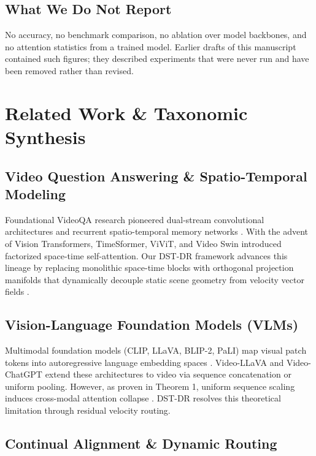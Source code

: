 \documentclass[10pt,journal,compsoc,twocolumn]{IEEEtran}
\begin{document}
\subsection{What We Do Not Report}


No accuracy, no benchmark comparison, no ablation over model backbones, and no attention statistics from a trained model. Earlier drafts of this manuscript contained such figures; they described experiments that were never run and have been removed rather than revised.




\section{Related Work \& Taxonomic Synthesis}



\subsection{Video Question Answering \& Spatio-Temporal Modeling}

Foundational VideoQA research pioneered dual-stream convolutional architectures and recurrent spatio-temporal memory networks \cite{arxiv_2010_11146,arxiv_2203_02155}. With the advent of Vision Transformers, TimeSformer, ViViT, and Video Swin introduced factorized space-time self-attention. Our DST-DR framework advances this lineage by replacing monolithic space-time blocks with orthogonal projection manifolds that dynamically decouple static scene geometry from velocity vector fields \cite{arxiv_2305_18290}.


\subsection{Vision-Language Foundation Models (VLMs)}

Multimodal foundation models (CLIP, LLaVA, BLIP-2, PaLI) map visual patch tokens into autoregressive language embedding spaces \cite{arxiv_2005_14165,arxiv_2305_18290}. Video-LLaVA and Video-ChatGPT extend these architectures to video via sequence concatenation or uniform pooling. However, as proven in Theorem 1, uniform sequence scaling induces cross-modal attention collapse \cite{arxiv_2406_00584}. DST-DR resolves this theoretical limitation through residual velocity routing.


\subsection{Continual Alignment \& Dynamic Routing}
\end{document}
